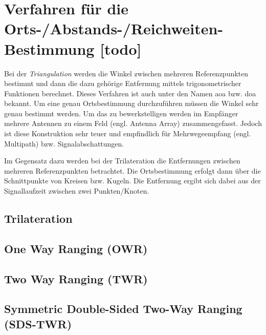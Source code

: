 \section{Verfahren für die Orts-/Abstands-/Reichweiten-Bestimmung [todo]}

Bei der \textit{Triangulation} werden die Winkel zwischen mehreren Referenzpunkten bestimmt und dann die dazu gehörige Entfernung mittels trigonometrischer Funktionen berechnet. Dieses Verfahren ist auch unter den Namen \Gls{aoa} bzw. \Gls{doa} bekannt. Um eine genau Ortsbestimmung durchzuführen müssen die Winkel sehr genau bestimmt werden. Um das zu bewerkstelligen werden im Empfänger mehrere Antennen zu einem Feld (engl. Antenna Array) zusammengefasst. Jedoch ist diese Konstruktion sehr teuer und empfindlich für Mehrwegeempfang (engl. Multipath) bzw. Signalabschattungen. \cite{gezici2005localization, liu2007survey, decawave2014rtls}

Im Gegensatz dazu werden bei der Trilateration die Entfernungen zwischen mehreren Referenzpunkten betrachtet. Die Ortsbestimmung erfolgt dann über die Schnittpunkte von Kreisen bzw. Kugeln. Die Entfernung ergibt sich dabei aus der Signallaufzeit zwischen zwei Punkten/Knoten. 



%
%
%
%



\subsection{Trilateration}


\subsection{One Way Ranging (OWR)}
\subsection{Two Way Ranging (TWR)}
\subsection{Symmetric Double-Sided Two-Way Ranging (SDS-TWR)}








